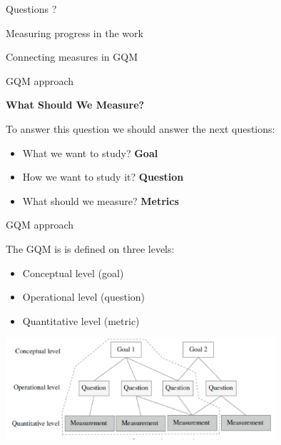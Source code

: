 \documentclass{beamer}
\begin{document}
\begin{frame}{\centerline{}}


\begin{center}
{\Large
Questions ?
}
\end{center}


\end{frame}

\begin{frame}{\centerline{Measuring progress in the work}}

\begin{center}
{\Large
Connecting measures in GQM
}
\end{center}
\end{frame}

\begin{frame}{\centerline{GQM approach}}


\textbf{What Should We Measure?}
\newline 

To answer this question we should answer the next questions:

\begin{itemize}
\item  What we want to study?   \textbf{Goal}
\item  How we want to study it? \textbf{Question}
\item   What should we measure? \textbf{Metrics}
\end{itemize}







\end{frame}

\begin{frame}{\centerline{GQM approach}}


The GQM is is defined on three levels:
\begin{itemize}

\item  Conceptual level (goal)
\item  Operational level (question)
\item  Quantitative level (metric)

\end{itemize}

\begin{center}
\includegraphics[width=100mm]{A2022.IDSEPC.SperimentazioneDeduzione/image-02.png}
\end{center}
\end{frame}
\end{document}
